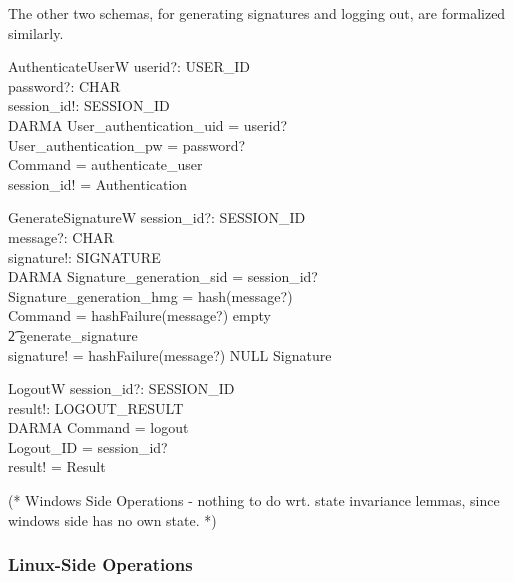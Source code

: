 \documentclass[a4paper,pdftex]{article}
\newenvironment{holz-proof}{\comment}{\endcomment}
\begin{document}
The other two schemas, for generating signatures and
logging out,  are formalized similarly.

\begin{schema}{AuthenticateUserW}
  userid?: USER\_ID \\
  password?: \seq CHAR \\
  session\_id!: SESSION\_ID \\
  DARMA
  \where
  User\_authentication\_uid = userid? \\
  User\_authentication\_pw = password? \\
  Command = authenticate\_user \\
  session\_id! = Authentication \\
\end{schema}

\begin{schema}{GenerateSignatureW}
  session\_id?: SESSION\_ID \\
  message?: \seq CHAR \\
  signature!: SIGNATURE \\
  DARMA
  \where
  Signature\_generation\_sid = session\_id? \\
  Signature\_generation\_hmg = hash(message?) \\
  Command = \IF hashFailure(message?) \THEN empty \\
\t2         \ELSE generate\_signature  \\
  signature! = \IF hashFailure(message?) \THEN NULL
            \ELSE Signature
\end{schema}

\begin{schema}{LogoutW}
  session\_id?: SESSION\_ID \\
  result!: LOGOUT\_RESULT \\
  DARMA
  \where
  Command = logout \\
  Logout\_ID = session\_id? \\
  result! = Result
\end{schema}

\begin{holz-proof}
(* Windows Side Operations - nothing to do wrt. state invariance lemmas,
   since windows side has no own state. *)
\end{holz-proof}


\subsubsection{Linux-Side Operations} \label{lin-spec-sec}
\end{document}
